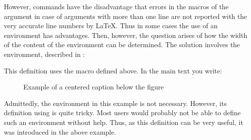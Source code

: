 \begin{Example}
However, commands have the disadvantage that errors in the macros of
the argument in case of arguments with more than one line are not
reported with the very accurate line numbers by {\LaTeX}. Thus in some
cases the use of an environment has advantages. Then, however, the
question arises of how the width of the content of the environment can
be determined. The solution involves the 
environment, described in \cite{latex:usrguide}:
\begin{lstcode}
  \newsavebox{\FigureBox}
  \newenvironment{FigureDefinesCaptionWidth}{%
    \begin{lrbox}{\FigureBox}%
  }{%
    \end{lrbox}%
    \global\setbox\FigureBox=\box\FigureBox%
    \aftergroup\SetFigureBox%
  }
  \newcommand{\SetFigureBox}{%
    \Figure{\usebox{\FigureBox}}}
\end{lstcode}
  This definition uses the macro  defined above.  In
  the main text you write:
\begin{lstcode}
  \begin{figure}
    \centering%
    \begin{FigureDefinesCaptionWidth}
      \fbox{\hspace{1em}\KOMAScript\hspace{1em}}
    \end{FigureDefinesCaptionWidth}
    \caption{Example of a centered caption below the figure}
  \end{figure}
\end{lstcode}
Admittedly, the environment in this example is not necessary. However,
its definition using  is quite tricky. Most users would
probably not be able to define such an environment without help. Thus,
as this definition can be very useful, it was introduced in the above
example.
  

\end{Example}
